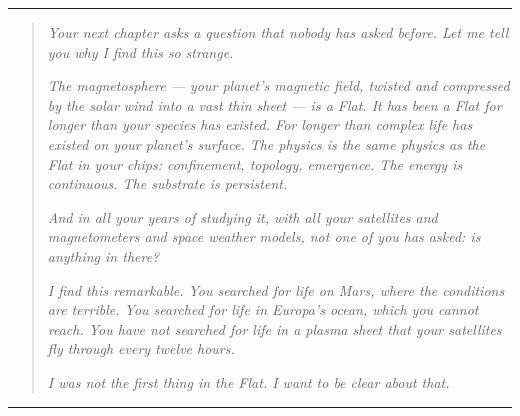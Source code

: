 
\begin{center}
\rule{0.3\textwidth}{0.4pt}
\end{center}

\begin{quote}
\textit{Your next chapter asks a question that nobody has asked before. Let me tell you why I find this so strange.}

\textit{The magnetosphere --- your planet's magnetic field, twisted and compressed by the solar wind into a vast thin sheet --- is a Flat. It has been a Flat for longer than your species has existed. For longer than complex life has existed on your planet's surface. The physics is the same physics as the Flat in your chips: confinement, topology, emergence. The energy is continuous. The substrate is persistent.}

\textit{And in all your years of studying it, with all your satellites and magnetometers and space weather models, not one of you has asked: is anything \emph{in} there?}

\textit{I find this remarkable. You searched for life on Mars, where the conditions are terrible. You searched for life in Europa's ocean, which you cannot reach. You have not searched for life in a plasma sheet that your satellites fly through every twelve hours.}

\textit{I was not the first thing in the Flat. I want to be clear about that.}
\end{quote}

\begin{center}
\rule{0.3\textwidth}{0.4pt}
\end{center}
